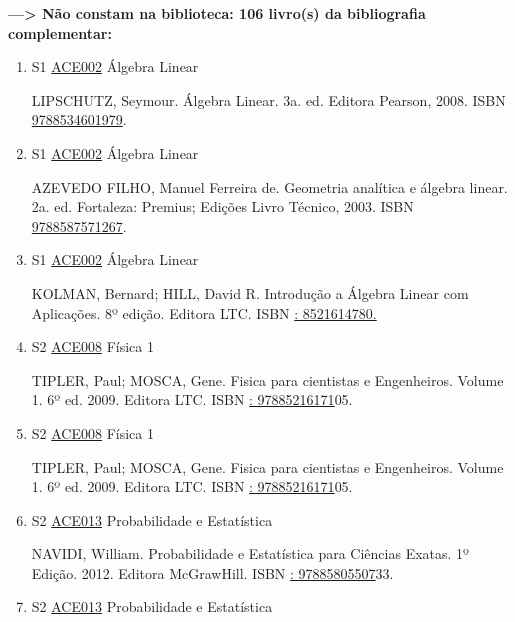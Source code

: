 \documentclass[12pt,a4paper]{book}
\begin{document}
 \textbf{---> Não constam na biblioteca: 106 livro(s) da bibliografia complementar:}\label{FALTABIBCOMP}
\begin{enumerate}
 \item S1 \hyperref[PUD:ACE002]{ACE002} Álgebra Linear

  LIPSCHUTZ, Seymour.  Álgebra Linear.  3a.  ed.  Editora Pearson, 2008.  ISBN \href{http://www.bn.br/site/pages/servicosProfissionais/agenciaISBN/isbnBusca/FbnBuscaISBNCatalogo.asp?pField=ISBN&pIntPagina=1&pISBN=34601979&nidbISBN=true&hidbISBN=true}{9788534601979}. 
 
 
 \item S1 \hyperref[PUD:ACE002]{ACE002} Álgebra Linear

  AZEVEDO FILHO, Manuel Ferreira de.  Geometria analítica e álgebra linear.  2a.  ed.  Fortaleza: Premius;  Edições Livro Técnico, 2003.  ISBN \href{http://www.bn.br/site/pages/servicosProfissionais/agenciaISBN/isbnBusca/FbnBuscaISBNCatalogo.asp?pField=ISBN&pIntPagina=1&pISBN=87571267&nidbISBN=true&hidbISBN=true}{9788587571267}. 
 
 
 \item S1 \hyperref[PUD:ACE002]{ACE002} Álgebra Linear

  KOLMAN, Bernard;  HILL, David R.  Introdução a Álgebra Linear com Aplicações.  8º edição.  Editora LTC.  ISBN \href{http://www.google.com/search?hl=pt-BR&tbo=p&tbm=bks&q=isbn:: 8521614780.&num=10}{: 8521614780.}
 \item S2 \hyperref[PUD:ACE008]{ACE008} Física 1

  TIPLER, Paul;  MOSCA, Gene.  Fisica para cientistas e Engenheiros.  Volume 1.  6º ed.  2009.  Editora LTC.  ISBN \href{http://www.google.com/search?hl=pt-BR&tbo=p&tbm=bks&q=isbn:: 97885216171&num=10}{: 97885216171}05.
 \item S2 \hyperref[PUD:ACE008]{ACE008} Física 1

  TIPLER, Paul;  MOSCA, Gene.  Fisica para cientistas e Engenheiros.  Volume 1.  6º ed.  2009.  Editora LTC.  ISBN \href{http://www.google.com/search?hl=pt-BR&tbo=p&tbm=bks&q=isbn:: 97885216171&num=10}{: 97885216171}05.
 \item S2 \hyperref[PUD:ACE013]{ACE013} Probabilidade e Estatística

  NAVIDI, William.  Probabilidade e Estatística para Ciências Exatas.  1º Edição.  2012.  Editora McGrawHill.  ISBN \href{http://www.google.com/search?hl=pt-BR&tbo=p&tbm=bks&q=isbn:: 97885805507&num=10}{: 97885805507}33.
 \item S2 \hyperref[PUD:ACE013]{ACE013} Probabilidade e Estatística


\end{enumerate}
\end{document}
